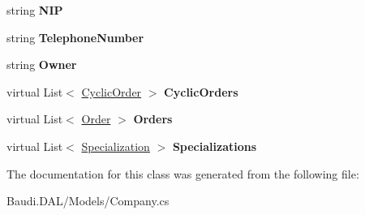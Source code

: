 \begin{DoxyCompactItemize}
\item 
\hypertarget{class_baudi_1_1_d_a_l_1_1_models_1_1_company_adad28eedfdcd7b1a9a714efd33b60392}{}string {\bfseries N\+I\+P}\label{class_baudi_1_1_d_a_l_1_1_models_1_1_company_adad28eedfdcd7b1a9a714efd33b60392}

\item 
\hypertarget{class_baudi_1_1_d_a_l_1_1_models_1_1_company_a96af51d9daf8bc740f21d90a9ee284da}{}string {\bfseries Telephone\+Number}\label{class_baudi_1_1_d_a_l_1_1_models_1_1_company_a96af51d9daf8bc740f21d90a9ee284da}

\item 
\hypertarget{class_baudi_1_1_d_a_l_1_1_models_1_1_company_a431eb455c0ea119512ac83ad8ec92d8c}{}string {\bfseries Owner}\label{class_baudi_1_1_d_a_l_1_1_models_1_1_company_a431eb455c0ea119512ac83ad8ec92d8c}

\item 
\hypertarget{class_baudi_1_1_d_a_l_1_1_models_1_1_company_a92378e87cd1ef77122d14031d3cb6527}{}virtual List$<$ \hyperlink{class_baudi_1_1_d_a_l_1_1_models_1_1_cyclic_order}{Cyclic\+Order} $>$ {\bfseries Cyclic\+Orders}\label{class_baudi_1_1_d_a_l_1_1_models_1_1_company_a92378e87cd1ef77122d14031d3cb6527}

\item 
\hypertarget{class_baudi_1_1_d_a_l_1_1_models_1_1_company_a096fd9a89d5e2402d928806d5002eac3}{}virtual List$<$ \hyperlink{class_baudi_1_1_d_a_l_1_1_models_1_1_order}{Order} $>$ {\bfseries Orders}\label{class_baudi_1_1_d_a_l_1_1_models_1_1_company_a096fd9a89d5e2402d928806d5002eac3}

\item 
\hypertarget{class_baudi_1_1_d_a_l_1_1_models_1_1_company_a2caa682509ca6bcebf4ce14b1901424a}{}virtual List$<$ \hyperlink{class_baudi_1_1_d_a_l_1_1_models_1_1_specialization}{Specialization} $>$ {\bfseries Specializations}\label{class_baudi_1_1_d_a_l_1_1_models_1_1_company_a2caa682509ca6bcebf4ce14b1901424a}

\end{DoxyCompactItemize}


The documentation for this class was generated from the following file\+:\begin{DoxyCompactItemize}
\item 
Baudi.\+D\+A\+L/\+Models/Company.\+cs\end{DoxyCompactItemize}
